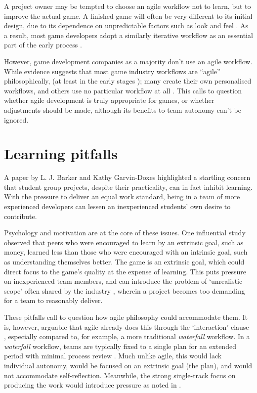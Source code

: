 \documentclass{scrartcl}
\begin{document}
A project owner may be tempted to choose an agile workflow not to learn, but to improve the actual game. A finished game will often be very different to its initial design, due to its dependence on unpredictable factors such as look and feel \cite{collaboration}. As a result, most game developers adopt a similarly iterative workflow as an essential part of the early process \cite{iteration, olddays, devstudy}.

However, game development companies as a majority don't use an agile workflow. While evidence suggests that most game industry workflows are ``agile'' philosophically, (at least in the early stages \cite{olddays}); many create their own personalised workflows, and others use no particular workflow at all \cite{devstudy}. This calls to question whether agile development is truly appropriate for games, or whether adjustments should be made, although its benefits to team autonomy can't be ignored.


\section{Learning pitfalls}
A paper by L. J. Barker and Kathy Garvin-Doxes \cite{group2003} highlighted a startling concern that student group projects, despite their practicality, can in fact inhibit learning. With the pressure to deliver an equal work standard, being in a team of more experienced developers can lessen an inexperienced students' own desire to contribute.

Psychology and motivation are at the core of these issues. One influential study \cite{motivation} observed that peers who were encouraged to learn by an extrinsic goal, such as money, learned less than those who were encouraged with an intrinsic goal, such as understanding themselves better. The game is an extrinsic goal, which could direct focus to the game's quality at the expense of learning. This puts pressure on inexperienced team members, and can introduce the problem of `unrealistic scope' often shared by the industry \cite{problems}, wherein a project becomes too demanding for a team to reasonably deliver.

These pitfalls call to question how agile philosophy could accommodate them. It is, however, arguable that agile already does this through the `interaction' clause \cite{manifesto}, especially compared to, for example, a more traditional \textit{waterfall} workflow. In a \textit{waterfall} workflow, teams are typically fixed to a single plan for an extended period with minimal process review \cite{waterfall}. Much unlike agile, this would lack individual autonomy, would be focused on an extrinsic goal (the plan), and would not accommodate self-reflection. Meanwhile, the strong single-track focus on producing the work would introduce pressure as noted in  \cite{group2003}.
\end{document}
